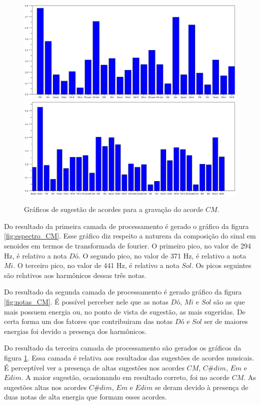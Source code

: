 \begin{figure}[h]
	\centering
		\includegraphics[keepaspectratio=true,scale=0.45]{figuras/CM/acordes_1_cm.eps}
		\includegraphics[keepaspectratio=true,scale=0.45]{figuras/CM/acordes_2_cm.eps}
	\caption{Gráficos de sugestão de acordes para a gravação do acorde $CM$.}
  \label{fig:acordes_CM}
\end{figure}

Do resultado da primeira camada de processamento é gerado o gráfico da figura \ref{fig:espectro_CM}. Esse gráfico diz respeito a natureza da composição do sinal em senoides em termos de transformada de fourier. O primeiro pico, no valor de 294 Hz, é relativo a nota $Dó$. O segundo pico, no valor de 371 Hz, é relativo a nota $Mi$. O terceiro pico, no valor de 441 Hz, é relativo a nota $Sol$. Os picos seguintes são relativos aos harmônicos dessas três notas.

Do resultado da segunda camada de processamento é gerado gráfico da figura \ref{fig:notas_CM}. É possível perceber nele que as notas $Dó$, $Mi$ e $Sol$ são as que mais possuem energia ou, no ponto de vista de sugestão, as mais sugeridas. De certa forma um dos fatores que contribuiram das notas $Dó$ e $Sol$ ser de maiores energias foi devido a presença dos harmônicos.

Do resultado da terceira camada de processamento são gerados os gráficos da figura \ref{fig:acordes_CM}. Essa camada é relativa aos resultados das sugestões de acordes musicais. É perceptível ver a presença de altas sugestões nos acordes $CM$, $C\#dim$, $Em$ e $Edim$. A maior sugestão, ocasionando em resultado correto, foi no acorde $CM$. As sugestões altas nos acordes $C\#dim$, $Em$ e $Edim$ se deram devido à presença de duas notas de alta energia que formam esses acordes.

